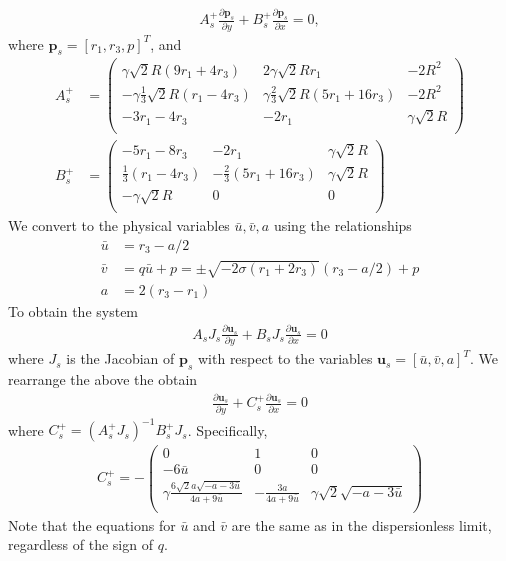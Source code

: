 \documentclass[12pt]{article}
\numberwithin{equation}{section}
\begin{document}
\begin{align}
    A_{s}^+\frac{\partial \textbf{p}_{s}}{\partial y} + B_{s}^+\frac{\partial \textbf{p}_{s}}{\partial x} =0, \label{vector eq for statKPWS}
\end{align}
where $\textbf{p}_{s} = [r_1,r_3,p]^T$, and 
\begin{subequations}
    \begin{align*}
        A_{s}^+ &= \left(
\begin{array}{cccc}
 \gamma\sqrt{2} R (9 r_1+4 r_3) & 2\gamma\sqrt{2} R r_1 & -2 R^2 \\
 -\gamma\frac{1}{3} \sqrt{2} R (r_1-4 r_3) & \gamma\frac{2}{3} \sqrt{2} R (5r_1+16 r_3) & -2 R^2 \\
 -3 r_1-4 r_3 & -2r_1 & \gamma\sqrt{2} R \\
\end{array}
\right)
\\
B_{s}^+ &= \left(
\begin{array}{cccc}
 -5 r_1-8 r_3 & -2r_1 & \gamma\sqrt{2} R \\
 \frac{1}{3} (r_1-4 r_3) & -\frac{2}{3} (5r_1+16 r_3) & \gamma\sqrt{2} R \\
 -\gamma\sqrt{2} R & 0 & 0 \\
\end{array}
\right)
\end{align*}
\end{subequations}
We convert to the physical variables $\bar u, \bar v, a$ using the relationships
\begin{subequations}
\begin{align}
    \bar u &= r_3 - a/2 \\
    \bar v &= q\bar u + p = \pm \sqrt{-2\sigma(r_1+2r_3)}(r_3-a/2) + p \\
    a &= 2(r_3-r_1)
\end{align}
\end{subequations}
To obtain the system 
\begin{align*}
    A_sJ_s\frac{\partial \textbf{u}_{s}}{\partial y} + B_sJ_s\frac{\partial \textbf{u}_{s}}{\partial x} = 0
\end{align*}
where $J_s$ is the Jacobian of $\textbf{p}_s$ with respect to the variables $\textbf{u}_s = [\bar u, \bar v, a]^T$. We rearrange the above the obtain 
\begin{align*}
    \frac{\partial \textbf{u}_{s}}{\partial y} + C_s^+\frac{\partial \textbf{u}_{s}}{\partial x} = 0
\end{align*}
where $C_s^+ = (A_s^+J_s)^{-1}B_s^+J_s$. Specifically, 
\begin{align}
    C_s^+ = - \left(
\begin{array}{ccc}
 0 & 1 & 0 \\
 -6 \bar u & 0 & 0 \\
 \gamma\frac{6 \sqrt{2} a \sqrt{-a-3 \bar u}}{4 a+9 \bar u} & -\frac{3 a}{4 a+9 \bar u} & \gamma \sqrt{2} \sqrt{-a-3 \bar u} \\
\end{array}
\right)
\end{align}
Note that the equations for $\bar u$ and $\bar v$ are the same as in the dispersionless limit, regardless of the sign of $q$.
\end{document}
